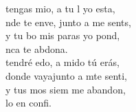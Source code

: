 \begin{cancion}
	\begin{chorus}%
		 tengas mio, a tu l yo esta,\\
		nde te enve, junto a me sents,  \\
		y  tu bo mis paras yo pond,\\
		nca te abdona.\\
	\jump
		 tendré edo, a mido tú erás,\\
		donde vayajunto a mte senti,\\
		y  tus mos siem me abandon, \\
		lo en  confi.  \jump\\
	\end{chorus}%
\end{cancion}%
